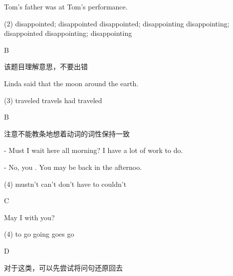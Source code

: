 \begin{question}[tags={xiaoxuect}]
Tom's father was \blank[width=1cm]{} at Tom's \blank[width=1cm]{} performance.

  \begin{tasks}(2)
    \task disappointed; disappointed
    \task disappointed; disappointing
    \task disappointing; disappointed
    \task disappointing; disappointing
  \end{tasks}
\end{question}
\begin{solution}
B

该题目理解意思，不要出错
\end{solution}

\begin{question}[tags={xiaoxuect}]
Linda said that the moon \blank[width=1cm]{} around the earth.

  \begin{tasks}(3)
    \task traveled
    \task travels
    \task had traveled
  \end{tasks}
\end{question}
\begin{solution}
B

注意不能教条地想着动词的词性保持一致
\end{solution}

\begin{question}[tags={xiaoxuect}]
- Must I wait here all morning? I have a lot of work to do.

\noindent - No, you \blank[width=1cm]{}. You may be back in the afternoo.

  \begin{tasks}(4)
    \task mustn't
    \task can't
    \task don't have to
    \task couldn't
  \end{tasks}
\end{question}
\begin{solution}
C
\end{solution}

\begin{question}[tags={xiaoxuect}]
May I \blank[width=1cm]{} with you?

  \begin{tasks}(4)
    \task to go
    \task going
    \task goes
    \task go
  \end{tasks}
\end{question}
\begin{solution}
D

对于这类，可以先尝试将问句还原回去
\end{solution}


